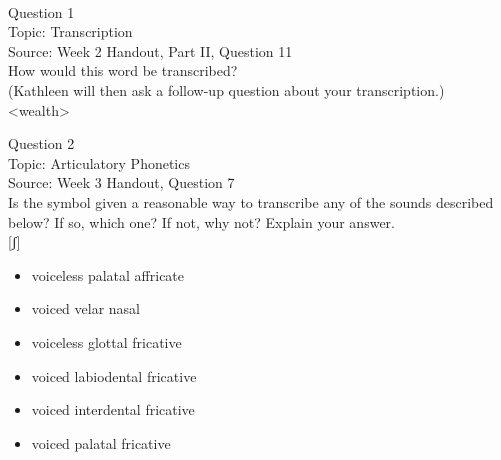 \documentclass[12pt]{article}
\begin{document}
\newpage

\begin{center}
\textbf{{\color{red}{\HUGE END OF EXAM}}}\\

\end{center}
\newpage

\begin{center}
\textbf{{\color{blue}{\HUGE START OF EXAM\\}}}

\textbf{{\color{blue}{\HUGE Student ID: 78265\\}}}

\textbf{{\color{blue}{\HUGE \\}}}

\end{center}
\newpage

{\large Question 1}\\

Topic: Transcription\\
Source: Week 2 Handout, Part II, Question 11\\

How would this word be transcribed?\\ (Kathleen will then ask a follow-up question about your transcription.)\\

<wealth>


\newpage

{\large Question 2}\\

Topic: Articulatory Phonetics\\
Source: Week 3 Handout, Question 7\\

Is the symbol given a reasonable way to transcribe any of the sounds described below? If so, which one? If not, why not? Explain your answer.\\

{[ʃ]}

\begin{itemize} \item voiceless palatal affricate \item voiced velar nasal \item voiceless glottal fricative \item voiced labiodental fricative \item voiced interdental fricative \item voiced palatal fricative \end{itemize}
\end{document}
